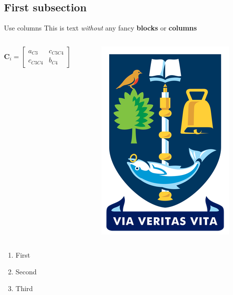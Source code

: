 \documentclass[usenames,dvipsnames, 8pt]{beamer}
\begin{document}
\subsection{First subsection} %
\begin{frame}{Use columns} %
This is text \textit{without} any fancy \textbf{blocks} or \textbf{columns} 
    \begin{columns}
    \vspace{0.7cm}
    \centering
    \begin{equation}
        \textbf{C}_{i} = \begin{bmatrix}
        a_{C3} & c_{C3C4} \\
        c_{C3C4} & b_{C4} 
        \end{bmatrix}
    \end{equation}
        \begin{figure}
            \centering
            \includegraphics[width=0.3\linewidth]{Figs/Uni_arms.png}
        \end{figure}
    \end{columns}
    \vspace{2cm} %
    \begin{enumerate} %
        \item First
        \item Second
        \item Third
    \end{enumerate}
\end{frame}
\end{document}
